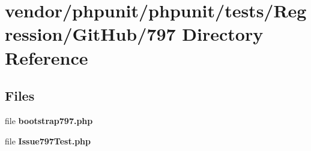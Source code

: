 \section{vendor/phpunit/phpunit/tests/\+Regression/\+Git\+Hub/797 Directory Reference}
\label{dir_83469136ccaf70adf91e2bd995f3cb3a}
\subsection*{Files}
\begin{DoxyCompactItemize}
\item 
file {\bf bootstrap797.\+php}
\item 
file {\bf Issue797\+Test.\+php}
\end{DoxyCompactItemize}
